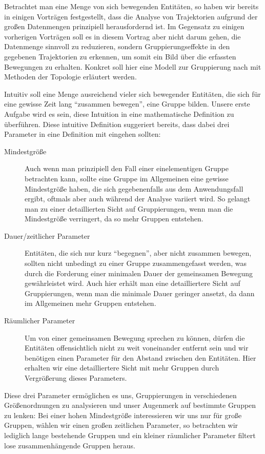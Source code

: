 Betrachtet man eine Menge von sich bewegenden Entitäten, so haben wir bereits in einigen Vorträgen festgestellt, dass die Analyse von Trajektorien aufgrund der großen Datenmengen prinzipiell herausfordernd ist.
Im Gegensatz zu einigen vorherigen Vorträgen soll es in diesem Vortrag aber nicht darum gehen, die Datenmenge sinnvoll zu reduzieren, sondern Gruppierungseffekte in den gegebenen Trajektorien zu erkennen, um somit ein Bild über die erfassten Bewegungen zu erhalten.
Konkret soll hier eine Modell zur Gruppierung nach \textcite{buchin2015} mit Methoden der Topologie erläutert werden.

Intuitiv soll eine Menge ausreichend vieler sich bewegender Entitäten, die sich für eine gewisse Zeit lang \enquote{zusammen bewegen}, eine Gruppe bilden.
Unsere erste Aufgabe wird es sein, diese Intuition in eine mathematische Definition zu überführen.
Diese intuitive Definition suggeriert bereits, dass dabei drei Parameter in eine Definition mit eingehen sollten:
\begin{description}
	\item[Mindestgröße] Auch wenn man prinzipiell den Fall einer einelementigen Gruppe betrachten kann, sollte eine Gruppe im Allgemeinen eine gewisse Mindestgröße haben, die sich gegebenenfalls aus dem Anwendungsfall ergibt, oftmals aber auch während der Analyse variiert wird.
	So gelangt man zu einer detaillierten Sicht auf Gruppierungen, wenn man die Mindestgröße verringert, da so mehr Gruppen entstehen.
	\item[Dauer/zeitlicher Parameter] Entitäten, die sich nur kurz \enquote{begegnen}, aber nicht zusammen bewegen, sollten nicht unbedingt zu einer Gruppe zusammengefasst werden, was durch die Forderung einer minimalen Dauer der gemeinsamen Bewegung gewährleistet wird.
	Auch hier erhält man eine detailliertere Sicht auf Gruppierungen, wenn man die minimale Dauer geringer ansetzt, da dann im Allgemeinen mehr Gruppen entstehen.
	\item[Räumlicher Parameter] Um von einer gemeinsamen Bewegung sprechen zu können, dürfen die Entitäten offensichtlich nicht zu weit voneinander entfernt sein und wir benötigen einen Parameter für den Abstand zwischen den Entitäten.
	Hier erhalten wir eine detailliertere Sicht mit mehr Gruppen durch Vergrößerung dieses Parameters.
\end{description}
Diese drei Parameter ermöglichen es uns, Gruppierungen in verschiedenen Größenordnungen zu analysieren und unser Augenmerk auf bestimmte Gruppen zu lenken: Bei einer hohen Mindestgröße interessieren wir uns nur für große Gruppen, wählen wir einen großen zeitlichen Parameter, so betrachten wir lediglich lange bestehende Gruppen und ein kleiner räumlicher Parameter filtert lose zusammenhängende Gruppen heraus.

